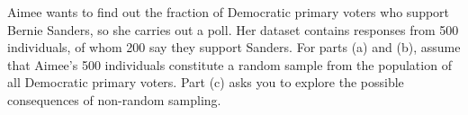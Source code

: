 \documentclass[addpoints,12pt]{exam}
\begin{document}
\begin{questions}
\question Aimee wants to find out the fraction of Democratic primary voters who support Bernie Sanders, so she carries out a poll. Her dataset contains responses from 500 individuals, of whom 200 say they support Sanders.
For parts (a) and (b), assume that Aimee's 500 individuals constitute a random sample from the population of all Democratic primary voters.
Part (c) asks you to explore the possible consequences of non-random sampling.
\end{questions}
\end{document}
